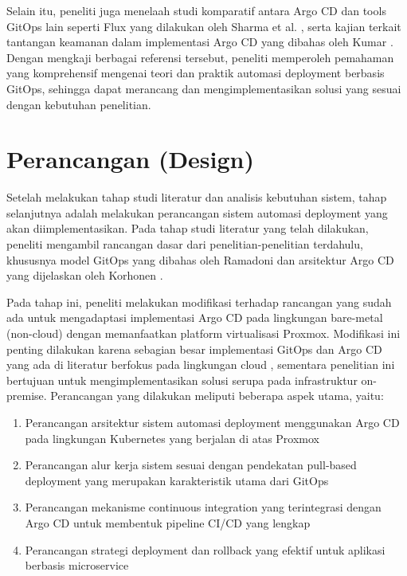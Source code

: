 Selain itu, peneliti juga menelaah studi komparatif antara Argo CD dan tools GitOps lain seperti Flux yang dilakukan oleh Sharma et al. \cite{Sharma2022},
serta kajian terkait tantangan keamanan dalam implementasi Argo CD yang dibahas oleh Kumar \cite{Kumar2023}. Dengan mengkaji berbagai referensi tersebut,
peneliti memperoleh pemahaman yang komprehensif mengenai teori dan praktik automasi deployment berbasis GitOps, sehingga dapat merancang dan mengimplementasikan solusi yang sesuai dengan kebutuhan penelitian.

\section{Perancangan (Design)}
Setelah melakukan tahap studi literatur dan analisis kebutuhan sistem, tahap selanjutnya adalah melakukan perancangan sistem automasi deployment yang akan diimplementasikan. Pada tahap studi literatur yang telah dilakukan, peneliti mengambil rancangan dasar dari penelitian-penelitian terdahulu, khususnya model GitOps yang dibahas oleh Ramadoni \cite{Ramadoni2021} dan arsitektur Argo CD yang dijelaskan oleh Korhonen \cite{Korhonen2021}.

Pada tahap ini, peneliti melakukan modifikasi terhadap rancangan yang sudah ada untuk mengadaptasi implementasi Argo CD pada lingkungan bare-metal (non-cloud) dengan memanfaatkan platform virtualisasi Proxmox. Modifikasi ini penting dilakukan karena sebagian besar implementasi GitOps dan Argo CD yang ada di literatur berfokus pada lingkungan cloud \cite{Bolscher2019}, sementara penelitian ini bertujuan untuk mengimplementasikan solusi serupa pada infrastruktur on-premise.
Perancangan yang dilakukan meliputi beberapa aspek utama, yaitu:

\begin{enumerate}
    \item Perancangan arsitektur sistem automasi deployment menggunakan Argo CD pada lingkungan Kubernetes yang berjalan di atas Proxmox
    \item Perancangan alur kerja sistem sesuai dengan pendekatan pull-based deployment yang merupakan karakteristik utama dari GitOps \cite{Weaveworks2017}
    \item Perancangan mekanisme continuous integration yang terintegrasi dengan Argo CD untuk membentuk pipeline CI/CD yang lengkap
    \item Perancangan strategi deployment dan rollback yang efektif untuk aplikasi berbasis microservice
\end{enumerate}

